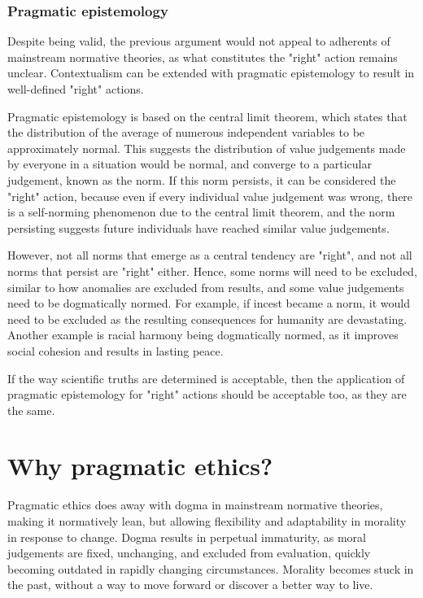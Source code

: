 \documentclass[11pt]{article}
\begin{document}
\subsubsection{Pragmatic epistemology}
\label{sec:orgb23a6a3}
Despite being valid, the previous argument
would not appeal to adherents of mainstream normative theories,
as what constitutes the "right" action remains unclear.
Contextualism can be extended with pragmatic epistemology
to result in well-defined "right" actions.

Pragmatic epistemology is based on the central limit theorem,
which states that the distribution of the average of
numerous independent variables to be approximately normal.
This suggests the distribution of value judgements made by
everyone in a situation would be normal,
and converge to a particular judgement, known as the norm.
If this norm persists, it can be considered the "right" action,
because even if every individual value judgement was wrong,
there is a self-norming phenomenon due to the central limit theorem,
and the norm persisting suggests future individuals have
reached similar value judgements.

However, not all norms that emerge as a central tendency are "right",
and not all norms that persist are "right" either.
Hence, some norms will need to be excluded,
similar to how anomalies are excluded from results,
and some value judgements need to be dogmatically normed.
For example, if incest became a norm, it would need to be excluded
as the resulting consequences for humanity are devastating.
Another example is racial harmony being dogmatically normed,
as it improves social cohesion and results in lasting peace.

If the way scientific truths are determined is acceptable,
then the application of pragmatic epistemology for "right" actions
should be acceptable too, as they are the same.
\section{Why pragmatic ethics?}
\label{sec:org61c72f5}
Pragmatic ethics does away with dogma in mainstream normative theories,
making it normatively lean, but allowing flexibility and adaptability
in morality in response to change.
Dogma results in perpetual immaturity,
as moral judgements are fixed, unchanging, and excluded from evaluation,
quickly becoming outdated in rapidly changing circumstances.
Morality becomes stuck in the past, without a way to move forward
or discover a better way to live.
\end{document}
